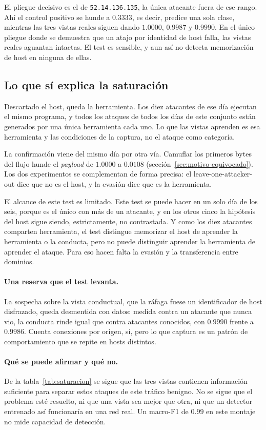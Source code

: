 El pliegue decisivo es el de \texttt{52.14.136.135}, la única atacante fuera de
ese rango. Ahí el control positivo se hunde a $0.3333$, es decir, predice una
sola clase, mientras las tres vistas reales siguen dando $1.0000$, $0.9987$
y $0.9990$. En el único pliegue donde se demuestra que un atajo por identidad
de host falla, las vistas reales aguantan intactas. El test es sensible, y aun
así no detecta memorización de host en ninguna de ellas.

\subsection*{Lo que sí explica la saturación}

Descartado el host, queda la herramienta. Los diez atacantes de ese día ejecutan
el mismo programa, y todos los ataques de todos los días de este conjunto están
generados por una única herramienta cada uno. Lo que las vistas aprenden es esa
herramienta y las condiciones de la captura, no el ataque como categoría.

La confirmación viene del mismo día por otra vía. Camuflar los primeros bytes
del flujo hunde el \emph{payload} de $1.0000$ a $0.0108$
(sección~\ref{sec:motivo-equivocado}). Los dos experimentos se complementan de
forma precisa: el leave-one-attacker-out dice que no es el host, y la evasión
dice que es la herramienta.

El alcance de este test es limitado. Este test se puede hacer en un solo día
de los seis, porque es el único con más de un atacante, y en los otros cinco la
hipótesis del host sigue siendo, estrictamente, no contrastada. Y como los diez
atacantes comparten herramienta, el test distingue memorizar el host de aprender
la herramienta o la conducta, pero no puede distinguir aprender la herramienta
de aprender el ataque. Para eso hacen falta la evasión y la transferencia entre
dominios.

\paragraph{Una reserva que el test levanta.} La sospecha sobre la vista
conductual, que la ráfaga fuese un identificador de host disfrazado, queda
desmentida con datos: medida contra un atacante que nunca vio, la conducta rinde
igual que contra atacantes conocidos, con $0.9990$ frente a $0.9986$. Cuenta
conexiones por origen, sí, pero lo que captura es un patrón de comportamiento
que se repite en hosts distintos.

\paragraph{Qué se puede afirmar y qué no.} De la tabla~\ref{tab:saturacion} se
sigue que las tres vistas contienen información suficiente para separar estos
ataques de este tráfico benigno. No se sigue que el problema esté resuelto, ni
que una vista sea mejor que otra, ni que un detector entrenado así funcionaría
en una red real. Un macro-F1 de $0.99$ en este montaje no mide capacidad de
detección.

